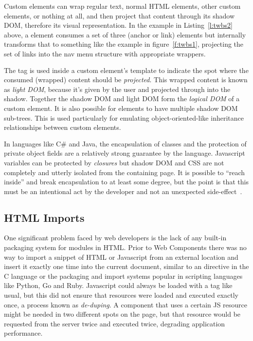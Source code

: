 Custom elements can wrap regular text, normal HTML elements, other custom elements, or nothing at all,
and then project that content through its shadow DOM, 
therefore its visual representation.
In the example in Listing~\ref{l:twbs2} above, 
a \textbf{} element consumes a set of three 
\textbf{} (anchor or link) elements but internally transforms that to something like the example in figure~\ref{f:twbs1}, 
projecting the set of links into the nav menu structure with appropriate wrappers.

The  tag is used inside a custom element's template to indicate the spot where the consumed (wrapped) content should be \textit{projected}. 
This wrapped content is known as 
\textit{light DOM}, 
because it's given by the user and projected through into the shadow.
Together the shadow DOM and light DOM form the \textit{logical DOM} of a custom element.
It is also possible for elements to have multiple shadow DOM sub-trees. 
This is used particularly for emulating object-oriented-like inheritance relationships between custom elements.

In languages like C\# and Java, the encapsulation of classes and the protection of private object fields are a relatively strong guarantee by the language.
Javascript variables can be protected by \textit{closures}
but shadow DOM and CSS are not completely and utterly isolated from the containing page.
It is possible to ``reach inside'' and break encapsulation to at least some degree, 
but the point is that this must be an intentional act by the developer and not an unexpected side-effect~\cite{bidelman2014}.

\subsection{HTML Imports}
One significant problem faced by web developers is the lack of any built-in packaging system for modules in HTML.
Prior to Web Components there was no way to import a snippet of HTML or Javascript from an external location and insert it exactly one time into the current document, 
similar to an  directive in the C language or the packaging and import systems popular in scripting languages
like Python, Go and Ruby. 
Javascript could always be loaded with a  tag like usual, but this did not ensure that resources were loaded and executed exactly once, a process known as \textit{de-duping}.
A component that uses a certain JS resource might be needed in two different spots on the page, 
but that resource would be requested from the server twice and executed twice, degrading application performance.

